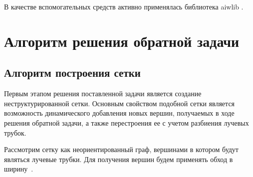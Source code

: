 \documentclass[12pt, cleqn, a4paper]{article}
\begin{document}
В качестве вспомогательных средств активно применялась библиотека aiwlib \cite{aiwlib}.

\newpage
\section{Алгоритм решения обратной задачи}
\subsection{Алгоритм построения сетки}
Первым этапом решения поставленной задачи является создание неструктурированной сетки. Основным свойством подобной сетки является возможность динамического добавления новых вершин, получаемых в ходе решения обратной задачи, а также перестроения ее с учетом разбиения лучевых трубок.

Рассмотрим сетку как неориентированный граф, вершинами в котором будут являться лучевые трубки. Для получения вершин будем применять обход в ширину~\cite{cormen2009introduction, tarjan1983data}.
\end{document}
